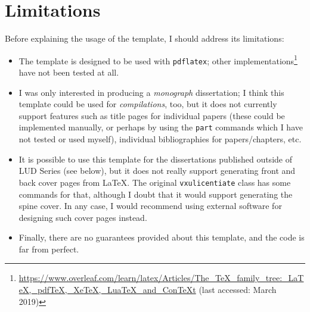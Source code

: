 \documentclass[10pt,a4paper]{article}
\begin{document}
\section{Limitations}
Before explaining the usage of the template, I should address its limitations:
\begin{itemize}
\item The template is designed to be used with \texttt{pdflatex}; other implementations\footnote{\url{https://www.overleaf.com/learn/latex/Articles/The_TeX_family_tree:_LaTeX,_pdfTeX,_XeTeX,_LuaTeX_and_ConTeXt} (last accessed: March 2019)} have not been tested at all. 
\item I was only interested in producing a \emph{monograph} dissertation; I think this template could be used for \emph{compilations}, too, but it does not currently support features such as title pages for individual papers (these could be implemented manually, or perhaps by using the \texttt{part} commands which I have not tested or used myself), individual bibliographies for papers/chapters, etc. 
\item It is possible to use this template for the dissertations published outside of LUD Series (see below), but it does not really support generating front and back cover pages from LaTeX. The original \texttt{vxulicentiate} class has some commands for that, although I doubt that it would support generating the spine cover. In any case, I would recommend using external software for designing such cover pages instead.
\item Finally, there are no guarantees provided about this template, and the code is far from perfect.  
\end{itemize}

\clearpage
\end{document}
